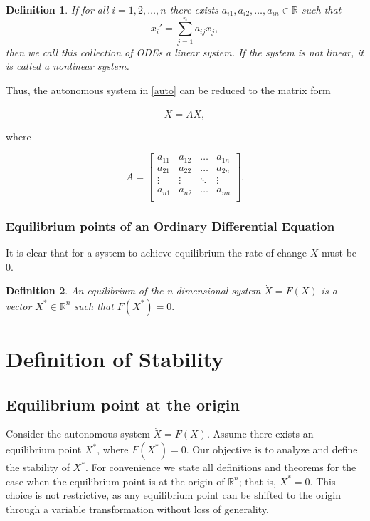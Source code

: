 \documentclass{article}
\newtheorem{definition}{Definition}
\begin{document}
\begin{definition}
    If for all $i=1,2,\dots,n$ there exists $a_{i1},a_{i2},\dots,a_{in} \in \mathbb{R}$ such that
    $$x_i' = \sum_{j=1}^n a_{ij} x_j,$$
    then we call this collection of ODEs a linear system. If the system is not linear, it is called a nonlinear system.
\end{definition}

Thus, the autonomous system in \eqref{auto} can be reduced to the matrix form

\begin{equation}\label{linear}
    \dot{X} = AX,
\end{equation}

where

\[
A = \begin{bmatrix}
    a_{11} & a_{12} & \hdots & a_{1n} \\
    a_{21} & a_{22} & \hdots & a_{2n} \\
    \vdots & \vdots & \ddots & \vdots \\
    a_{n1} & a_{n2} & \hdots & a_{nn} \\
\end{bmatrix}.
\]



\subsubsection{Equilibrium points of an Ordinary Differential Equation}

It is clear that for a system to achieve equilibrium the rate of change $\dot{X}$ must be $0$.
\begin{definition}
    An equilibrium of the n dimensional system $\dot{X} = F(X)$ is a vector $X^* \in \mathbb{R}^n$  such that $F(X^*)=0.$
\end{definition}


\section{Definition of Stability}
\subsection{Equilibrium point at the origin}
Consider the autonomous system $\dot{X} = F(X)$. Assume there exists an equilibrium point $X^*$, where $F(X^*)=0.$ Our objective is to analyze and define the stability of $X^*$. For convenience we state all definitions and theorems for the case when the equilibrium point is at the origin of $\mathbb{R}^n$; that is, $X^*=0.$ This choice is not restrictive, as any equilibrium point can be shifted to the origin through a variable transformation without loss of generality.
\end{document}
